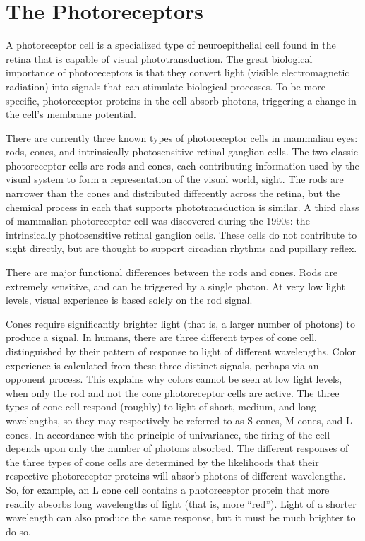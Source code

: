 \hypertarget{the-photoreceptors}{%
\section{The Photoreceptors}\label{the-photoreceptors}}

A photoreceptor cell is a specialized type of neuroepithelial cell found in the retina that is capable of visual phototransduction. The great biological importance of photoreceptors is that they convert light (visible electromagnetic radiation) into signals that can stimulate biological processes. To be more specific, photoreceptor proteins in the cell absorb photons, triggering a change in the cell's membrane potential.

There are currently three known types of photoreceptor cells in mammalian eyes: rods, cones, and intrinsically photosensitive retinal ganglion cells. The two classic photoreceptor cells are rods and cones, each contributing information used by the visual system to form a representation of the visual world, sight. The rods are narrower than the cones and distributed differently across the retina, but the chemical process in each that supports phototransduction is similar. A third class of mammalian photoreceptor cell was discovered during the 1990s: the intrinsically photosensitive retinal ganglion cells. These cells do not contribute to sight directly, but are thought to support circadian rhythms and pupillary reflex.

There are major functional differences between the rods and cones. Rods are extremely sensitive, and can be triggered by a single photon. At very low light levels, visual experience is based solely on the rod signal.

Cones require significantly brighter light (that is, a larger number of photons) to produce a signal. In humans, there are three different types of cone cell, distinguished by their pattern of response to light of different wavelengths. Color experience is calculated from these three distinct signals, perhaps via an opponent process. This explains why colors cannot be seen at low light levels, when only the rod and not the cone photoreceptor cells are active. The three types of cone cell respond (roughly) to light of short, medium, and long wavelengths, so they may respectively be referred to as S-cones, M-cones, and L-cones. In accordance with the principle of univariance, the firing of the cell depends upon only the number of photons absorbed. The different responses of the three types of cone cells are determined by the likelihoods that their respective photoreceptor proteins will absorb photons of different wavelengths. So, for example, an L cone cell contains a photoreceptor protein that more readily absorbs long wavelengths of light (that is, more ``red''). Light of a shorter wavelength can also produce the same response, but it must be much brighter to do so.

